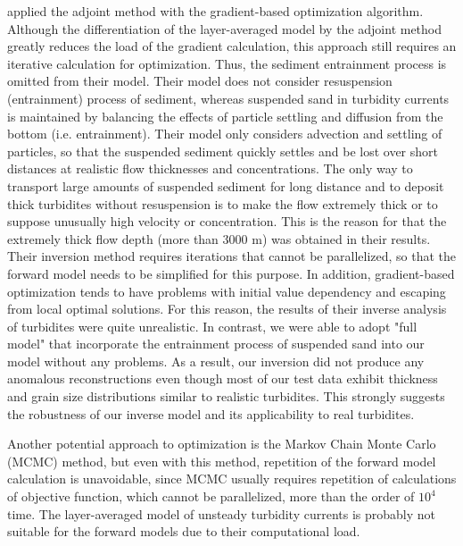 \citet{Parkinson2017} applied the adjoint method with the gradient-based optimization algorithm. Although the differentiation of the layer-averaged model by the adjoint method greatly reduces the load of the gradient calculation, this approach still requires an iterative calculation for optimization. Thus, the sediment entrainment process is omitted from their model. Their model does not consider resuspension (entrainment) process of sediment, whereas suspended sand in turbidity currents is maintained by balancing the effects of particle settling and diffusion from the bottom (i.e. entrainment). Their model only considers advection and settling of particles, so that the suspended sediment quickly settles and be lost over short distances at realistic flow thicknesses and concentrations. The only way to transport large amounts of suspended sediment for long distance and to deposit thick turbidites without resuspension is to make the flow extremely thick or to suppose unusually high velocity or concentration. This is the reason for that the extremely thick flow depth (more than 3000 m) was obtained in their results. Their inversion method requires iterations that cannot be parallelized, so that the forward model needs to be simplified for this purpose. In addition, gradient-based optimization tends to have problems with initial value dependency and escaping from local optimal solutions. For this reason, the results of their inverse analysis of turbidites were quite unrealistic. In contrast, we were able to adopt "full model" that incorporate the entrainment process of suspended sand into our model without any problems. As a result, our inversion did not produce any anomalous reconstructions even though most of our test data exhibit thickness and grain size distributions similar to realistic turbidites. This strongly suggests the robustness of our inverse model and its applicability to real turbidites.

Another potential approach to optimization is the Markov Chain Monte Carlo (MCMC) method, but even with this method, repetition of the forward model calculation is unavoidable, since MCMC usually requires repetition of calculations of objective function, which cannot be parallelized, more than the order of $10^4$ time. The layer-averaged model of unsteady turbidity currents is probably not suitable for the forward models due to their computational load.

